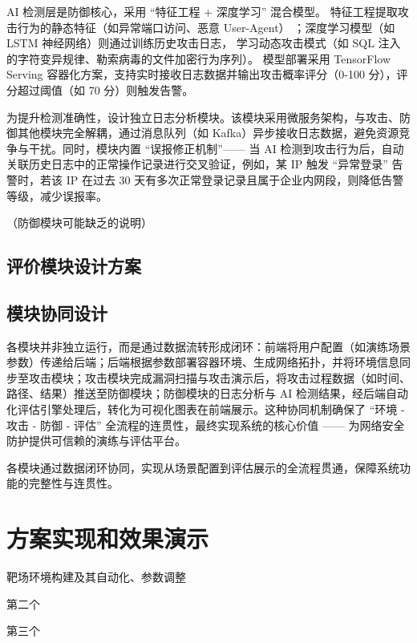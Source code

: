 \documentclass[lang=cn,10pt]{elegantbook}
\begin{document}
AI 检测层是防御核心，采用 “特征工程 + 深度学习” 混合模型。
特征工程提取攻击行为的静态特征（如异常端口访问、恶意 User-Agent）
；深度学习模型（如 LSTM 神经网络）则通过训练历史攻击日志，
学习动态攻击模式（如 SQL 注入的字符变异规律、勒索病毒的文件加密行为序列）。
模型部署采用 TensorFlow Serving 容器化方案，支持实时接收日志数据并输出攻击概率评分（0-100 分），评分超过阈值（如 70 分）则触发告警。​

为提升检测准确性，设计独立日志分析模块。该模块采用微服务架构，与攻击、防御其他模块完全解耦，通过消息队列（如 Kafka）异步接收日志数据，避免资源竞争与干扰。同时，模块内置 “误报修正机制”—— 当 AI 检测到攻击行为后，自动关联历史日志中的正常操作记录进行交叉验证，例如，某 IP 触发 “异常登录” 告警时，若该 IP 在过去 30 天有多次正常登录记录且属于企业内网段，则降低告警等级，减少误报率。

\begin{proposition}
（防御模块可能缺乏的说明）
\end{proposition}



\section{评价模块设计方案}


\section{模块协同设计}
各模块并非独立运行，而是通过数据流转形成闭环：前端将用户配置（如演练场景参数）传递给后端；后端根据参数部署容器环境、生成网络拓扑，并将环境信息同步至攻击模块；攻击模块完成漏洞扫描与攻击演示后，将攻击过程数据（如时间、路径、结果）推送至防御模块；防御模块的日志分析与 AI 检测结果，经后端自动化评估引擎处理后，转化为可视化图表在前端展示。这种协同机制确保了 “环境 - 攻击 - 防御 - 评估” 全流程的连贯性，最终实现系统的核心价值 —— 为网络安全防护提供可信赖的演练与评估平台。
\begin{definition}
    各模块通过数据闭环协同，实现从场景配置到评估展示的全流程贯通，保障系统功能的完整性与连贯性。
\end{definition}

\chapter{方案实现和效果演示}
\begin{introduction}
  \item 靶场环境构建及其自动化、参数调整
  \item 第二个
  \item 第三个
\end{introduction}
\end{document}
